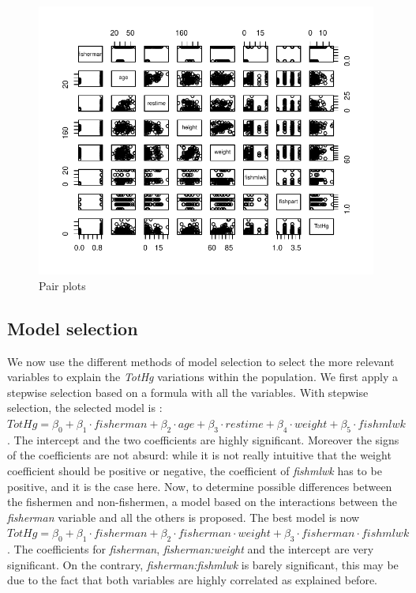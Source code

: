\documentclass[12pt,]{article}
\begin{document}
\begin{figure}
\centering
\includegraphics{Report_files/figure-latex/unnamed-chunk-8-1.pdf}
\caption{\label{fig:pair_plots}Pair plots}
\end{figure}

\subsection{Model selection}\label{model-selection}

We now use the different methods of model selection to select the more
relevant variables to explain the \emph{TotHg} variations within the
population. We first apply a stepwise selection based on a formula with
all the variables. With stepwise selection, the selected model is :
\(TotHg = \beta_0 + \beta_1 \cdot fisherman + \beta_2 \cdot age + \beta_3 \cdot restime + \beta_4 \cdot weight + \beta_5 \cdot fishmlwk\).
The intercept and the two coefficients are highly significant. Moreover
the signs of the coefficients are not absurd: while it is not really
intuitive that the weight coefficient should be positive or negative,
the coefficient of \emph{fishmlwk} has to be positive, and it is the
case here. Now, to determine possible differences between the fishermen
and non-fishermen, a model based on the interactions between the
\emph{fisherman} variable and all the others is proposed. The best model
is now
\(TotHg = \beta_0 + \beta_1 \cdot fisherman + \beta_2 \cdot fisherman \cdot weight + \beta_3 \cdot fisherman \cdot fishmlwk\).
The coefficients for \emph{fisherman}, \emph{fisherman:weight} and the
intercept are very significant. On the contrary,
\emph{fisherman:fishmlwk} is barely significant, this may be due to the
fact that both variables are highly correlated as explained before.
\end{document}
